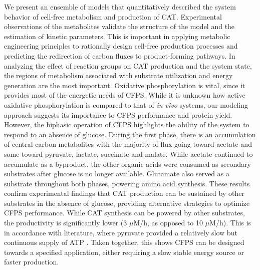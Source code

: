 \documentclass[12pt]{article}
\begin{document}
We present an ensemble of models that quantitatively described the system behavior of cell-free metabolism and production of CAT.
Experimental observations of the metabolites validate the structure of the model and the estimation of kinetic parameters.
This is important in applying metabolic engineering principles to rationally design cell-free production processes and predicting the redirection of carbon fluxes to product-forming pathways.
In analyzing the effect of reaction groups on CAT production and the system state, the regions of metabolism associated with substrate utilization and energy generation are the most important.
Oxidative phosphorylation is vital, since it provides most of the energetic needs of CFPS.
While it is unknown how active oxidative phosphorylation is compared to that of \textit{in vivo} systems, our modeling approach suggests its importance to CFPS performance and protein yield.
However, the biphasic operation of CFPS highlights the ability of the system to respond to an absence of glucose.
During the first phase, there is an accumulation of central carbon metabolites with the majority of flux going toward acetate and some toward pyruvate, lactate, succinate and malate.
While acetate continued to accumulate as a byproduct, the other organic acids were consumed as secondary substrates after glucose is no longer available.
Glutamate also served as a substrate throughout both phases, powering amino acid synthesis.
These results confirm experimental findings that CAT production can be sustained by other substrates in the absence of glucose, providing alternative strategies to optimize CFPS performance.
While CAT synthesis can be powered by other substrates, the productivity is significantly lower (3 $\mu$M/h, as opposed to 10 $\mu$M/h).
This is in accordance with literature, where pyruvate provided a relatively slow but continuous supply of ATP \cite{swartz_nature2001}.
Taken together, this shows CFPS can be designed towards a specified application, either requiring a slow stable energy source or faster production.
\end{document}
